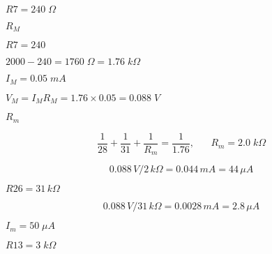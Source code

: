 {\newpage\clearpage
{}%
$R7=240\;\Omega$%
\lthtmlinlinemathZ
\lthtmlcheckvsize\clearpage}

{\newpage\clearpage
{}%
$R_M$%
\lthtmlinlinemathZ
\lthtmlcheckvsize\clearpage}

{\newpage\clearpage
{}%
$R7=240$%
\lthtmlinlinemathZ
\lthtmlcheckvsize\clearpage}

{\newpage\clearpage
{}%
$2000-240=1760\;\Omega=1.76\;k\Omega$%
\lthtmlinlinemathZ
\lthtmlcheckvsize\clearpage}

{\newpage\clearpage
{}%
$I_M=0.05\;mA$%
\lthtmlinlinemathZ
\lthtmlcheckvsize\clearpage}

{\newpage\clearpage
{}%
$V_M=I_M R_M=1.76\times 0.05=0.088\;V$%
\lthtmlinlinemathZ
\lthtmlcheckvsize\clearpage}

{\newpage\clearpage
{}%
$R_m$%
\lthtmlinlinemathZ
\lthtmlcheckvsize\clearpage}

{\newpage\clearpage
{}%
\begin{displaymath}
    \frac{1}{28}+\frac{1}{31}+\frac{1}{R_m}=\frac{1}{1.76},
    \;\;\;\;\;\;  R_m=2.0\;k\Omega
    \end{displaymath}%
\lthtmldisplayZ
\lthtmlcheckvsize\clearpage}

{\newpage\clearpage
{}%
\begin{displaymath}
    0.088\,V/2\,k\Omega=0.044\,mA=44\,\mu A
    \end{displaymath}%
\lthtmldisplayZ
\lthtmlcheckvsize\clearpage}

{\newpage\clearpage
{}%
$R26=31\,k\Omega$%
\lthtmlinlinemathZ
\lthtmlcheckvsize\clearpage}

{\newpage\clearpage
{}%
\begin{displaymath}
    0.088\,V/31\,k\Omega=0.0028\,mA=2.8\,\mu A
    \end{displaymath}%
\lthtmldisplayZ
\lthtmlcheckvsize\clearpage}

{\newpage\clearpage
{}%
$I_m=50\;\mu A$%
\lthtmlinlinemathZ
\lthtmlcheckvsize\clearpage}

{\newpage\clearpage
{}%
$R13=3\;k\Omega$%
\lthtmlinlinemathZ
\lthtmlcheckvsize\clearpage}


